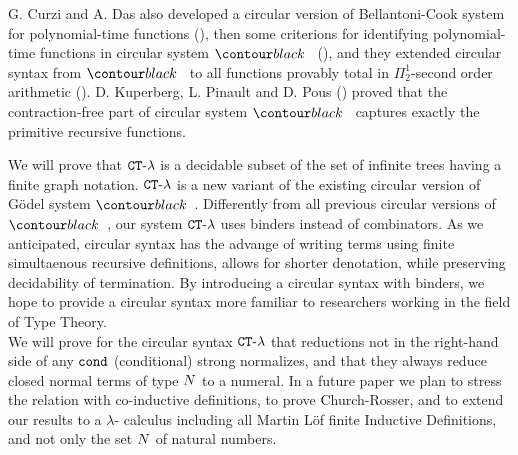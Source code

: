 G. Curzi and A. Das  also developed a circular version of Bellantoni-Cook system for 
polynomial-time functions (\cite{DBLP:conf/lics/Curzi022}), 
then some criterions for identifying polynomial-time functions
in circular system $\systemT$ (\cite{DBLP:conf/csl/Curzi023}),
and they extended circular syntax from $\systemT$ to all functions provably total in 
$\Pi^1_2$-second order arithmetic (\cite{DBLP:conf/lics/Curzi023}).
D. Kuperberg, L. Pinault and D. Pous (\cite{2021-Kuperberg-Pinault-Pous})
proved that the contraction-free part of circular system $\systemT$
captures exactly the primitive recursive functions.

%

We will prove that ${ {\tt CT}\mbox{-}\lambda}$ is a decidable subset of the set of infinite trees 
having a finite graph notation.
${ {\tt CT}\mbox{-}\lambda}$ is a new variant of the existing circular version of 
G\"{o}del system $\systemT$. Differently from all previous circular versions of 
$\systemT$, our system ${ {\tt CT}\mbox{-}\lambda}$ uses binders instead of combinators. 
As we anticipated, circular syntax has the advange of writing terms using
finite simultaenous recursive definitions, allows for shorter denotation, while preserving decidability of termination. By introducing a circular syntax with binders, 
we hope to provide a circular syntax more familiar to researchers working in the
field of Type Theory.
\\

We will prove for the circular syntax ${ {\tt CT}\mbox{-}\lambda}$
that reductions not in the right-hand side of any ${\tt cond}$ (conditional)
strong normalizes, and that they always reduce closed normal terms of type ${N}$ to a numeral. In a future paper we plan to stress the relation with co-inductive definitions, to prove Church-Rosser, and to extend our results to a $\lambda$-
calculus including all Martin L\"{o}f finite Inductive Definitions, and not only
the set ${N}$ of natural numbers.

